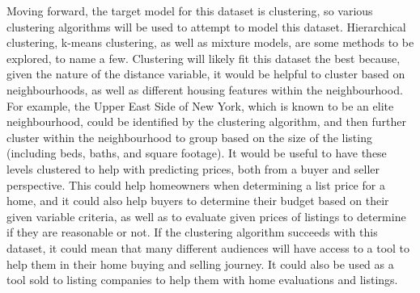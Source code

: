 \documentclass[11pt, a4paper]{article}
\begin{document}
Moving forward, the target model for this dataset is clustering, so various clustering algorithms will be used to attempt to model this dataset. Hierarchical clustering, k-means clustering, as well as mixture models, are some methods to be explored, to name a few. Clustering will likely fit this dataset the best because, given the nature of the distance variable, it would be helpful to cluster based on neighbourhoods, as well as different housing features within the neighbourhood. For example, the Upper East Side of New York, which is known to be an elite neighbourhood, could be identified by the clustering algorithm, and then further cluster within the neighbourhood to group based on the size of the listing (including beds, baths, and square footage). It would be useful to have these levels clustered to help with predicting prices, both from a buyer and seller perspective. This could help homeowners when determining a list price for a home, and it could also help buyers to determine their budget based on their given variable criteria, as well as to evaluate given prices of listings to determine if they are reasonable or not. If the clustering algorithm succeeds with this dataset, it could mean that many different audiences will have access to a tool to help them in their home buying and selling journey. It could also be used as a tool sold to listing companies to help them with home evaluations and listings.
\end{document}
